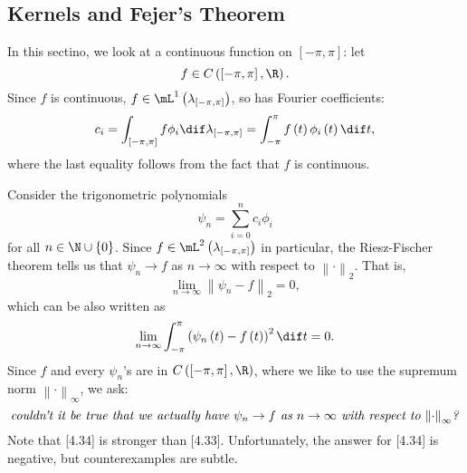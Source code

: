 \documentclass[pmath450]{subfiles}
\begin{document}
    \subsection{Kernels and Fejer's Theorem}

    In this sectino, we look at a continuous function on $\left[ -\pi,\pi \right]$: let
    \begin{equation*}
        f\in C\left( \left[ -\pi,\pi \right],\R \right).
    \end{equation*}
    Since $f$ is continuous, $f\in\lone\left( \lambda_{\left[ -\pi,\pi \right]} \right)$, so has Fourier coefficients:
    \begin{equation*}
        c_i = \int^{}_{\left[ -\pi,\pi \right]} f\phi_i\dif\lambda_{\left[ -\pi,\pi \right]} = \int^{\pi}_{-\pi} f\left( t \right)\phi_i\left( t \right)\dif t,
    \end{equation*}
    where the last equality follows from the fact that $f$ is continuous.

    Consider the trigonometric polynomials
    \begin{equation*}
        \psi_n = \sum^{n}_{i=0} c_i\phi_i
    \end{equation*}
    for all $n\in\N\cup\left\lbrace 0 \right\rbrace$. Since $f\in\mL^{2}\left( \lambda_{\left[ -\pi,\pi \right]} \right)$ in particular, the Riesz-Fischer theorem tells us that $\psi_n\to f$ as $n\to\infty$ with respect to $\left\lVert \cdot \right\rVert_{2}$. That is,
    \begin{equation}
        \lim_{n\to\infty} \left\lVert \psi_n-f \right\rVert_{2} = 0,
    \end{equation}
    which can be also written as
    \begin{equation*}
        \lim_{n\to\infty} \int^{\pi}_{-\pi} \left( \psi_n\left( t \right)-f\left( t \right) \right)^{2}\dif t = 0.
    \end{equation*}
    Since $f$ and every $\psi_n$'s are in $C\left( \left[ -\pi,\pi \right],\R \right)$, where we like to use the supremum norm $\left\lVert \cdot \right\rVert_{\infty}$, we ask:
    \begin{equation}
        \text{\textit{couldn't it be true that we actually have $\psi_n\to f$ as $n\to\infty$ with respect to $\left\lVert \cdot \right\rVert_{\infty}$?}}
    \end{equation}
    Note that [4.34] is stronger than [4.33]. Unfortunately, the answer for [4.34] is negative, but counterexamples are subtle.
\end{document}
